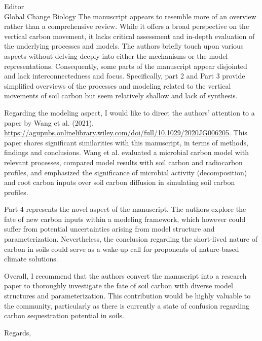 \documentclass[11pt]{bgcletter}
\begin{document}
\begin{letter}{Editor\\
   Global Change Biology
}
The manuscript appears to resemble more of an overview rather than a comprehensive review. While it offers a broad perspective on the vertical carbon movement, it lacks critical assessment and in-depth evaluation of the underlying processes and models. The authors briefly touch upon various aspects without delving deeply into either the mechanisms or the model representations. Consequently, some parts of the manuscript appear disjointed and lack interconnectedness and focus. Specifically, part 2 and Part 3 provide simplified overviews of the processes and modeling related to the vertical movements of soil carbon but seem relatively shallow and lack of synthesis. 

Regarding the modeling aspect, I would like to direct the authors' attention to a paper by Wang et al. (2021). \url{https://agupubs.onlinelibrary.wiley.com/doi/full/10.1029/2020JG006205}. This paper shares significant similarities with this manuscript, in terms of methods, findings and conclusions. Wang et al. evaluated a microbial carbon model with relevant processes, compared model results with soil carbon and radiocarbon profiles, and emphasized the significance of microbial activity (decomposition) and root carbon inputs over soil carbon diffusion in simulating soil carbon profiles.

Part 4 represents the novel aspect of the manuscript. The authors explore the fate of new carbon inputs within a modeling framework, which however could suffer from potential uncertainties arising from model structure and parameterization. Nevertheless, the conclusion regarding the short-lived nature of carbon in soils could serve as a wake-up call for proponents of nature-based climate solutions.

Overall, I recommend that the authors convert the manuscript into a research paper to thoroughly investigate the fate of soil carbon with diverse model structures and parameterization. This contribution would be highly valuable to the community, particularly as there is currently a state of confusion regarding carbon sequestration potential in soils.

 \closing{Regards,} 
 \end{letter}

 
\end{document}
